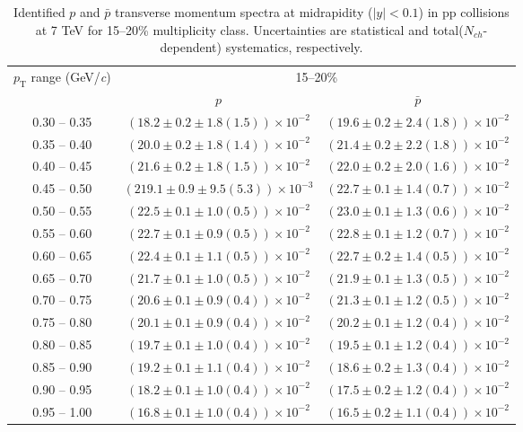 \begin{table}
\caption{Identified $p$ and $\bar{p}$  transverse momentum spectra at midrapidity ($|y|<0.1$) in pp collisions at 7 TeV for 15--20\% multiplicity class. Uncertainties are statistical and total($N_{ch}$-dependent) systematics, respectively.}
\label{tab:ProtonPlus_ProtonMinus_15to20}
\begin{center}
\begin{tabular}{ c | c c }
\hline
\multirow{2}{*}{$p_{\mathrm{T}}$ range (GeV/\textit{c})} & \multicolumn{2}{c}{15--20\%} \\ & $p$& $\bar{p}$\\ 
\hline
0.30 -- 0.35 & $(18.2\pm0.2\pm1.8(1.5))\times10^{-2}$ & $(19.6\pm0.2\pm2.4(1.8))\times10^{-2}$ \\ 
0.35 -- 0.40 & $(20.0\pm0.2\pm1.8(1.4))\times10^{-2}$ & $(21.4\pm0.2\pm2.2(1.8))\times10^{-2}$ \\ 
0.40 -- 0.45 & $(21.6\pm0.2\pm1.8(1.5))\times10^{-2}$ & $(22.0\pm0.2\pm2.0(1.6))\times10^{-2}$ \\ 
0.45 -- 0.50 & $(219.1\pm0.9\pm9.5(5.3))\times10^{-3}$ & $(22.7\pm0.1\pm1.4(0.7))\times10^{-2}$ \\ 
0.50 -- 0.55 & $(22.5\pm0.1\pm1.0(0.5))\times10^{-2}$ & $(23.0\pm0.1\pm1.3(0.6))\times10^{-2}$ \\ 
0.55 -- 0.60 & $(22.7\pm0.1\pm0.9(0.5))\times10^{-2}$ & $(22.8\pm0.1\pm1.2(0.7))\times10^{-2}$ \\ 
0.60 -- 0.65 & $(22.4\pm0.1\pm1.1(0.5))\times10^{-2}$ & $(22.7\pm0.2\pm1.4(0.5))\times10^{-2}$ \\ 
0.65 -- 0.70 & $(21.7\pm0.1\pm1.0(0.5))\times10^{-2}$ & $(21.9\pm0.1\pm1.3(0.5))\times10^{-2}$ \\ 
0.70 -- 0.75 & $(20.6\pm0.1\pm0.9(0.4))\times10^{-2}$ & $(21.3\pm0.1\pm1.2(0.5))\times10^{-2}$ \\ 
0.75 -- 0.80 & $(20.1\pm0.1\pm0.9(0.4))\times10^{-2}$ & $(20.2\pm0.1\pm1.2(0.4))\times10^{-2}$ \\ 
0.80 -- 0.85 & $(19.7\pm0.1\pm1.0(0.4))\times10^{-2}$ & $(19.5\pm0.1\pm1.2(0.4))\times10^{-2}$ \\ 
0.85 -- 0.90 & $(19.2\pm0.1\pm1.1(0.4))\times10^{-2}$ & $(18.6\pm0.2\pm1.3(0.4))\times10^{-2}$ \\ 
0.90 -- 0.95 & $(18.2\pm0.1\pm1.0(0.4))\times10^{-2}$ & $(17.5\pm0.2\pm1.2(0.4))\times10^{-2}$ \\ 
0.95 -- 1.00 & $(16.8\pm0.1\pm1.0(0.4))\times10^{-2}$ & $(16.5\pm0.2\pm1.1(0.4))\times10^{-2}$ \\ 

\end{tabular}
\end{center}
\end{table}
